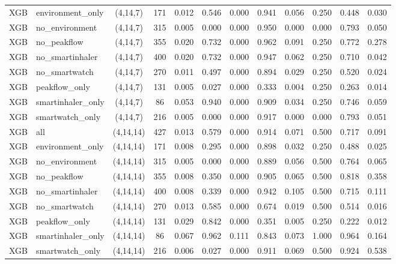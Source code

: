 \begin{longtable}{llcccccccccc}
XGB & environment\_only & (4,14,7) & 171 & 0.012 & 0.546 & 0.000 & 0.941 & 0.056 & 0.250 & 0.448 & 0.030 \\
XGB & no\_environment & (4,14,7) & 315 & 0.005 & 0.000 & 0.000 & 0.950 & 0.000 & 0.000 & 0.793 & 0.050 \\
XGB & no\_peakflow & (4,14,7) & 355 & 0.020 & 0.732 & 0.000 & 0.962 & 0.091 & 0.250 & 0.772 & 0.278 \\
XGB & no\_smartinhaler & (4,14,7) & 400 & 0.020 & 0.732 & 0.000 & 0.947 & 0.062 & 0.250 & 0.710 & 0.042 \\
XGB & no\_smartwatch & (4,14,7) & 270 & 0.011 & 0.497 & 0.000 & 0.894 & 0.029 & 0.250 & 0.520 & 0.024 \\
XGB & peakflow\_only & (4,14,7) & 131 & 0.005 & 0.027 & 0.000 & 0.333 & 0.004 & 0.250 & 0.263 & 0.014 \\
XGB & smartinhaler\_only & (4,14,7) & 86 & 0.053 & 0.940 & 0.000 & 0.909 & 0.034 & 0.250 & 0.746 & 0.059 \\
XGB & smartwatch\_only & (4,14,7) & 216 & 0.005 & 0.000 & 0.000 & 0.917 & 0.000 & 0.000 & 0.793 & 0.051 \\
XGB & all & (4,14,14) & 427 & 0.013 & 0.579 & 0.000 & 0.914 & 0.071 & 0.500 & 0.717 & 0.091 \\
XGB & environment\_only & (4,14,14) & 171 & 0.008 & 0.295 & 0.000 & 0.898 & 0.032 & 0.250 & 0.488 & 0.025 \\
XGB & no\_environment & (4,14,14) & 315 & 0.005 & 0.000 & 0.000 & 0.889 & 0.056 & 0.500 & 0.764 & 0.065 \\
XGB & no\_peakflow & (4,14,14) & 355 & 0.008 & 0.350 & 0.000 & 0.905 & 0.065 & 0.500 & 0.818 & 0.358 \\
XGB & no\_smartinhaler & (4,14,14) & 400 & 0.008 & 0.339 & 0.000 & 0.942 & 0.105 & 0.500 & 0.715 & 0.111 \\
XGB & no\_smartwatch & (4,14,14) & 270 & 0.013 & 0.585 & 0.000 & 0.674 & 0.019 & 0.500 & 0.514 & 0.016 \\
XGB & peakflow\_only & (4,14,14) & 131 & 0.029 & 0.842 & 0.000 & 0.351 & 0.005 & 0.250 & 0.222 & 0.012 \\
XGB & smartinhaler\_only & (4,14,14) & 86 & 0.067 & 0.962 & 0.111 & 0.843 & 0.073 & 1.000 & 0.964 & 0.164 \\
XGB & smartwatch\_only & (4,14,14) & 216 & 0.006 & 0.027 & 0.000 & 0.911 & 0.069 & 0.500 & 0.924 & 0.538 \\
\end{longtable}
